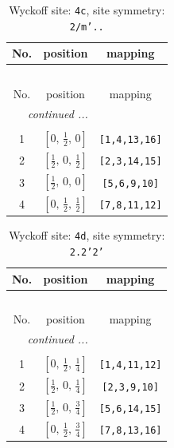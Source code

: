 \documentclass[fleqn,8pt]{jsarticle}
\begin{document}
\renewcommand{\arraystretch}{1.2}
\begin{longtable}{ccc}
\caption{Wyckoff site: {\tt 4c}, site symmetry: {\tt 2/m'..}}
 \\
 \hline \hline
No. & position & mapping \\ \hline \endfirsthead

\multicolumn{2}{l}{\tablename\ \thetable{}} \\
 \hline \hline
No. & position & mapping \\ \hline \endhead

 \hline \hline
\multicolumn{2}{r}{\footnotesize\it continued ...} \\ \endfoot

 \hline \hline
\multicolumn{2}{r}{} \\ \endlastfoot

1 & $\left[ 0,\, \frac{1}{2},\, 0 \right]$ & {\tt [1,4,13,16]} \\ \hline
2 & $\left[ \frac{1}{2},\, 0,\, \frac{1}{2} \right]$ & {\tt [2,3,14,15]} \\ \hline
3 & $\left[ \frac{1}{2},\, 0,\, 0 \right]$ & {\tt [5,6,9,10]} \\ \hline
4 & $\left[ 0,\, \frac{1}{2},\, \frac{1}{2} \right]$ & {\tt [7,8,11,12]} \\
\end{longtable}
\renewcommand{\arraystretch}{1.2}
\begin{longtable}{ccc}
\caption{Wyckoff site: {\tt 4d}, site symmetry: {\tt 2.2'2'}}
 \\
 \hline \hline
No. & position & mapping \\ \hline \endfirsthead

\multicolumn{2}{l}{\tablename\ \thetable{}} \\
 \hline \hline
No. & position & mapping \\ \hline \endhead

 \hline \hline
\multicolumn{2}{r}{\footnotesize\it continued ...} \\ \endfoot

 \hline \hline
\multicolumn{2}{r}{} \\ \endlastfoot

1 & $\left[ 0,\, \frac{1}{2},\, \frac{1}{4} \right]$ & {\tt [1,4,11,12]} \\ \hline
2 & $\left[ \frac{1}{2},\, 0,\, \frac{1}{4} \right]$ & {\tt [2,3,9,10]} \\ \hline
3 & $\left[ \frac{1}{2},\, 0,\, \frac{3}{4} \right]$ & {\tt [5,6,14,15]} \\ \hline
4 & $\left[ 0,\, \frac{1}{2},\, \frac{3}{4} \right]$ & {\tt [7,8,13,16]} \\
\end{longtable}
\end{document}
